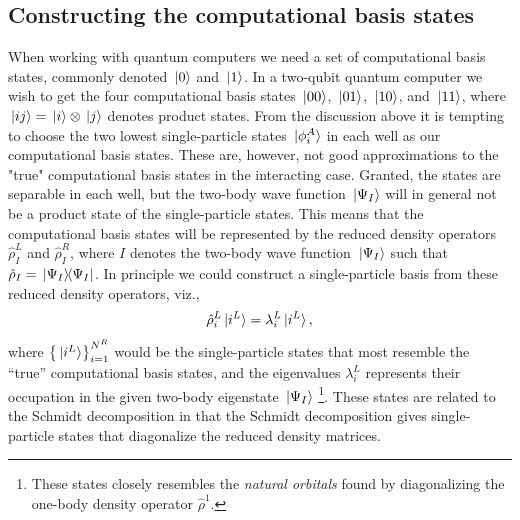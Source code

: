 \documentclass[twocolumn,superscriptaddress,unsortedaddress,
 amsmath,amssymb,
 aps,
]{revtex4-2}
\begin{document}
    \subsection{Constructing the computational basis states}
        When working with quantum computers we need a set of computational
        basis states, commonly denoted $\ket*{0}$ and $\ket*{1}$.
        In a two-qubit quantum computer we wish to get the four computational
        basis states $\ket*{00}$, $\ket*{01}$, $\ket*{10}$, and $\ket*{11}$,
        where $\ket*{ij} = \ket*{i} \otimes \ket*{j}$ denotes product states.
        From the discussion above it is tempting to choose the two lowest
        single-particle states $\ket*{\phi^{A}_i}$ in each well as our
        computational basis states.
        These are, however, not good approximations to the "true" computational
        basis states in the interacting case.
        Granted, the states are separable in each well, but the two-body
        wave function $\ket*{\Psi_I}$ will in general not be a product state
        of the single-particle states.
        This means that the computational basis states will be represented by
        the reduced density operators $\hat{\rho}^L_I$ and $\hat{\rho}^R_I$,
        where $I$ denotes the two-body wave function $\ket*{\Psi_I}$ such that
        $\hat{\rho}_I = \dyad*{\Psi_I}{\Psi_I}$.
        In principle we could construct a single-particle basis from these
        reduced density operators, viz.,
        \begin{align*}
            \hat{\rho}^L_i \ket*{i^L}
            = \lambda^L_i \ket*{i^L},
        \end{align*}
        where $\qty{\ket*{i^L}}_{i = 1}^{N^R}$ would be the single-particle
        states that most resemble the ``true'' computational basis states,
        and the eigenvalues $\lambda^L_i$ represents their occupation
        in the given two-body eigenstate $\ket*{\Psi_I}$ \footnote{
            These states closely resembles the \emph{natural orbitals}
            found by diagonalizing the one-body density operator $\hat{\rho}^1$.
        }.
        These states are related to the Schmidt decomposition in that the
        Schmidt decomposition gives single-particle states that diagonalize
        the reduced density matrices.
 
\end{document}

